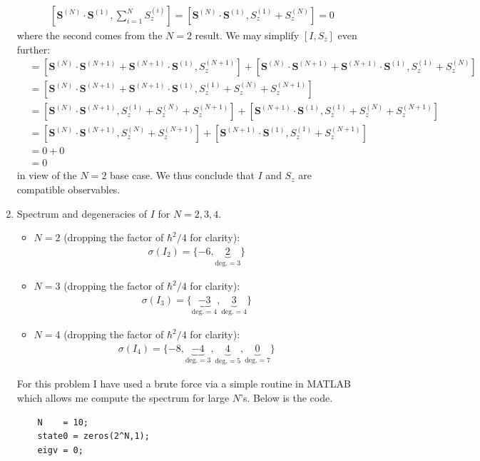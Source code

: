 \documentclass{article}
\theoremstyle{definition}
\newcommand{\lb}{\left[}
\newcommand{\rb}{\right]}
\begin{document}
\begin{enumerate}[label=(\alph*)]
\begin{align*}
	&\lb \mathbf{S}^{(N)}\cdot \mathbf{S}^{(1)} ,  \sum_{i=1}^N S_z^{(i)} \rb = \lb \mathbf{S}^{(N)}\cdot \mathbf{S}^{(1)}, S_z^{(1)} + S_z^{(N)} \rb = 0
	\end{align*}
	where the second comes from the $N=2$ result. We may simplify $[I,S_z]$ even further:
	\begin{align*}
	[I,S_z] 
	&=  \lb \mathbf{S}^{(N)}\cdot \mathbf{S}^{(N+1)} + \mathbf{S}^{(N+1)}\cdot \mathbf{S}^{(1)} , S_z^{(N+1)} \rb + \lb \mathbf{S}^{(N)}\cdot \mathbf{S}^{(N+1)} + \mathbf{S}^{(N+1)}\cdot \mathbf{S}^{(1)}  , S_z^{(1)} + S_z^{(N)}\rb \\
	&= \lb \mathbf{S}^{(N)}\cdot \mathbf{S}^{(N+1)} + \mathbf{S}^{(N+1)}\cdot \mathbf{S}^{(1)} , S_z^{(1)} + S_z^{(N)} + S_z^{(N+1)} \rb\\
	&= \lb \mathbf{S}^{(N)}\cdot \mathbf{S}^{(N+1)}, S_z^{(1)} + S_z^{(N)} + S_z^{(N+1)} \rb + \lb  \mathbf{S}^{(N+1)}\cdot \mathbf{S}^{(1)} ,  S_z^{(1)} + S_z^{(N)} + S_z^{(N+1)}\rb \\
	&= \lb \mathbf{S}^{(N)}\cdot \mathbf{S}^{(N+1)}, S_z^{(N)} + S_z^{(N+1)} \rb + \lb  \mathbf{S}^{(N+1)}\cdot \mathbf{S}^{(1)} ,  S_z^{(1)}  + S_z^{(N+1)}\rb\\
	&= 0 + 0 \\
	&=0 
	\end{align*}
	in view of the $N=2$ base case. We thus conclude that $I$ and $S_z$ are compatible observables.
	 
	
	
	\item Spectrum and degeneracies of $I$ for $N=2,3,4$. 
	\begin{itemize}
		\item $N=2$ (dropping the factor of $\hbar^2/4$ for clarity):
		\begin{align*}
		\boxed{\sigma(I_2) =  \{ -6, \underbrace{2}_{\text{deg.}=3}  \} }
		\end{align*}
		\item $N=3$ (dropping the factor of $\hbar^2/4$ for clarity):
		\begin{align*}
		\boxed{\sigma(I_3) = \{ \underbrace{-3}_{\text{deg.}=4}, \underbrace{3}_{\text{deg.}=4}  \}} 
		\end{align*}
		\item $N=4$ (dropping the factor of $\hbar^2/4$ for clarity):
		\begin{align*}
		\boxed{\sigma(I_4) = \{ -8, \underbrace{-4}_{\text{deg.}=3}, \underbrace{4}_{\text{deg.}=5}, \underbrace{0}_{\text{deg.}=7}  \} }
		\end{align*}
	\end{itemize}
	For this problem I have used a brute force via a simple routine in MATLAB which allows me compute the spectrum for large $N$'s. Below is the code. 
	\begin{lstlisting}
	N    = 10;
	state0 = zeros(2^N,1);
	eigv = 0;
	

\end{lstlisting}
\end{enumerate}
\end{document}
